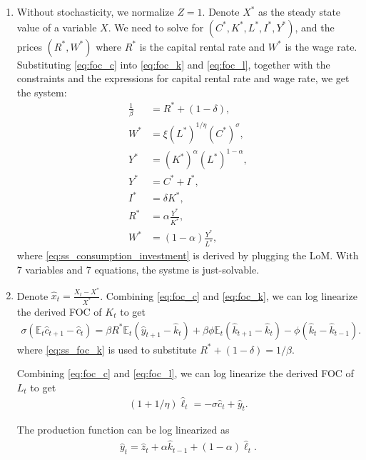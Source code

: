 \documentclass[12pt]{article}
\begin{document}
\begin{enumerate}[label=(\alph*)]
    \newpage
    \item Without stochasticity, we normalize $Z = 1$. Denote $X^*$ as the steady state value of a variable $X$. We need to solve for $(C^*, K^*, L^*, I^*, Y^*)$, and the prices $(R^*, W^*)$ where $R^*$ is the capital rental rate and $W^*$ is the wage rate. Substituting \eqref{eq:foc_c} into \eqref{eq:foc_k} and \eqref{eq:foc_l}, together with the constraints and the expressions for capital rental rate and wage rate, we get the system:
    \begin{align}
        \frac{1}{\beta} &= R^* + (1-\delta) , \label{eq:ss_foc_k}\\
        W^* &=  \xi (L^*)^{1/\eta} (C^*)^{\sigma}, \label{eq:ss_foc_l}\\
        Y^* &= (K^*)^{\alpha} (L^*)^{1-\alpha}, \label{eq:ss_prod}\\
        Y^* &= C^* + I^*, \label{eq:ss_consumption_investment}\\
        I^* &= \delta K^*, \label{eq:ss_lom}\\
        R^* &= \alpha \frac{Y^*}{K^*}, \label{eq:ss_mpk}\\
        W^* &= (1-\alpha) \frac{Y^*}{L^*}, \label{eq:ss_mpl}
    \end{align}
    where \eqref{eq:ss_consumption_investment} is derived by plugging the LoM. With 7 variables and 7 equations, the systme is just-solvable.

    \newpage
    \item Denote $\hat{x}_t = \frac{X_t - X^*}{X^*}$. Combining \eqref{eq:foc_c} and \eqref{eq:foc_k}, we can log linearize the derived FOC of $K_t$ to get
    \begin{align}\label{eq:ll_foc_k}
        \sigma (\mathbb{E}_t \hat{c}_{t+1} - \hat{c}_t)
        = \beta R^* \mathbb{E}_t (\hat{y}_{t+1} - \hat{k}_t)
        + \beta \phi \mathbb{E}_t (\hat{k}_{t+1} - \hat{k}_t)
        - \phi (\hat{k}_t - \hat{k}_{t-1}).
    \end{align}
    where \eqref{eq:ss_foc_k} is used to substitute $R^* + (1-\delta) = 1/\beta$.

    Combining \eqref{eq:foc_c} and \eqref{eq:foc_l}, we can log linearize the derived FOC of $L_t$ to get
    \begin{align}\label{eq:ll_foc_l}
        (1+1/\eta) \hat{\ell}_t = -\sigma \hat{c}_t + \hat{y}_t.
    \end{align}
    
    The production function can be log linearized as
    \begin{align}\label{eq:ll_prod}
        \hat{y}_t = \hat{z}_t +\alpha \hat{k}_{t-1} + (1-\alpha) \hat{\ell}_t.
    \end{align}


\end{enumerate}
\end{document}
